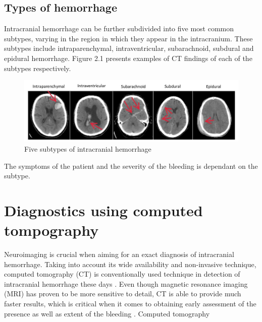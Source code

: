 \subsection{Types of hemorrhage}
Intracranial hemorrhage can be further subdivided into five most common subtypes, varying in the region in which they appear in the intracranium. \cite{ICHsubtypes-CT, imagingICH} These subtypes include intraparenchymal, intraventricular, subarachnoid, subdural and epidural hemorrhage. Figure 2.1 presents examples of CT findings of each of the subtypes respectively. 
\begin{figure}[h]
\begin{centering}
\includegraphics[width=15cm]{assets/images/subtypes}
\par\end{centering}
\caption{Five subtypes of intracranial hemorrhage \label{fig:subtypes}}
\end{figure}

The symptoms of the patient and the severity of the bleeding is dependant on the subtype. \cite{ICHsubtypes-CT}

\section{Diagnostics using computed tompography}
Neuroimaging is crucial when aiming for an exact diagnosis of intracranial hemorrhage. Taking into account its wide availability and non-invasive technique, computed tomography (CT) is conventionally used technique in detection of intracranial hemorrhage these days \cite{imagingICH}. Even though magnetic resonance imaging (MRI) has proven to be more sensitive to detail, CT is able to provide much faster results, which is critical when it comes to obtaining early assessment of the presence as well as extent of the bleeding \cite{imagingAfterBrainInjury}. Computed tomography

